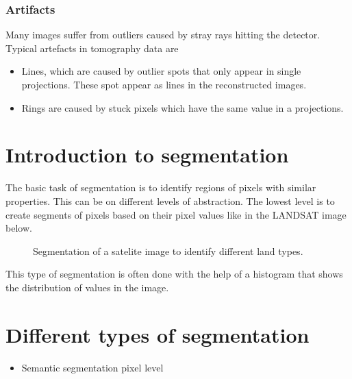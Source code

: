 \documentclass[letterpaper,10pt,english]{sphinxmanual}
\begin{document}
\subsubsection{Artifacts}
\label{\detokenize{ML4NeutronImageSegmentation:artifacts}}
Many images suffer from outliers caused by stray rays hitting the detector. Typical artefacts in tomography data are
\begin{itemize}
\item {} 
Lines, which are caused by outlier spots that only appear in single projections. These spot appear as lines in the reconstructed images.

\item {} 
Rings are caused by stuck pixels which have the same value in a projections.

\end{itemize}


\section{Introduction to segmentation}
\label{\detokenize{ML4NeutronImageSegmentation:introduction-to-segmentation}}
The basic task of segmentation is to identify regions of pixels with similar properties. This can be on different levels of abstraction. The lowest level is to create segments of pixels based on their pixel values like in the LANDSAT image below.

\begin{figure}[htbp]
\centering
\capstart

\noindent{}
\caption{Segmentation of a satelite image to identify different land types.}\label{\detokenize{ML4NeutronImageSegmentation:id7}}\end{figure}

This type of segmentation is often done with the help of a histogram that shows the distribution of values in the image.




\section{Different types of segmentation}
\label{\detokenize{ML4NeutronImageSegmentation:different-types-of-segmentation}}\begin{itemize}
\item {} 
Semantic segmentation \sphinxhyphen{} pixel level

\end{itemize}
\end{document}
